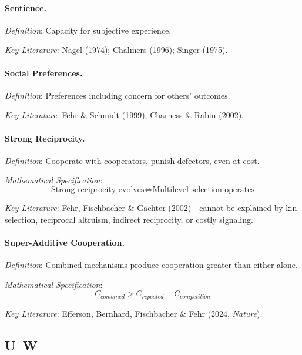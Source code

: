 \paragraph{Sentience.}
\textit{Definition}: Capacity for subjective experience.

\textit{Key Literature}: Nagel (1974); Chalmers (1996); Singer (1975).

\medskip

\paragraph{Social Preferences.}
\textit{Definition}: Preferences including concern for others' outcomes.

\textit{Key Literature}: Fehr \& Schmidt (1999); Charness \& Rabin (2002).

\medskip

\paragraph{Strong Reciprocity.}
\textit{Definition}: Cooperate with cooperators, punish defectors, even at cost.

\textit{Mathematical Specification}:
\begin{equation}
\text{Strong reciprocity evolves} \iff \text{Multilevel selection operates}
\end{equation}

\textit{Key Literature}: Fehr, Fischbacher \& Gächter (2002)---cannot be explained 
by kin selection, reciprocal altruism, indirect reciprocity, or costly signaling.

\medskip

\paragraph{Super-Additive Cooperation.}
\textit{Definition}: Combined mechanisms produce cooperation greater than either alone.

\textit{Mathematical Specification}:
\begin{equation}
C_{combined} > C_{repeated} + C_{competition}
\end{equation}

\textit{Key Literature}: Efferson, Bernhard, Fischbacher \& Fehr (2024, \textit{Nature}).

\subsection*{U--W}

